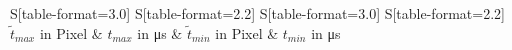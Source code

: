 \begin{table}
    \centering
    \caption{Aus dem TM-Scan bestimmte Laufzeiten in Pixeln $\tilde{t}$ und umgerechnete Laufzeiten $t$}
    \label{tab:ZeitHerz}
    \begin{tabular}{
	S[table-format=3.0]
	S[table-format=2.2]
	S[table-format=3.0]
	S[table-format=2.2]
	}
	\toprule
	{$\tilde{t}_{max}$ in \si{Pixel}}		& {$t_{max}$ in \si{\micro\second}}		& 
	{$\tilde{t}_{min}$ in \si{Pixel}}		& {$t_{min}$ in \si{\micro\second}}		\\ 
	\midrule
    
    \bottomrule
    \end{tabular}
    \end{table}
